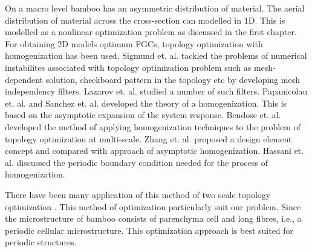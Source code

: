 \documentclass[openright,twoside]{iitkthesis}
\begin{document}
On a macro level bamboo has an asymmetric distribution of material\cite{habibi2015asymmetric}. The aerial distribution of material across the cross-section can modelled in 1D. This is modelled as a nonlinear optimization problem \cite{svanberg2007mma} as discussed in the first chapter.
For obtaining 2D models optimum FGCs, topology optimization\cite{bendsoe2009topology} with homogenization has been used. Sigmund et. al. \cite{sigmund1998numerical} tackled the problems of numerical instabilites associated with topology optimization problem such as mesh-dependent solution, checkboard pattern in the topology etc by developing mesh independency filters. Lazarov et. al. \cite{lazarov2011filters} studied a number of such filters. Papanicolau et. al. \cite{papanicolau1978asymptotic} and Sanchez et. al. \cite{sanchez1980non} developed the theory of a homogenization. This is based on the asymptotic expansion of the system response. Bendose et. al. \cite{bendsoe1988generating} developed the method of applying homogenization techniques to the problem of topology optimization at multi-scale. Zhang et. al. \cite{zhang2006scale} proposed a design element concept and compared with approach of asymptotic homogenization. Hassani et. al. \cite{hassani1998review} discussed the periodic boundary condition needed for the process of homogenization. \par 
There have been many application of this method of two scale topology optimization \cite{huang2015topology}\cite{huang2011topological}\cite{niu2009optimum}. This method of optimization particularly suit our problem. Since the microstructure of bamboo consists of parenchyma cell and long fibres, i.e., a periodic cellular microstructure. This optimization approach is best suited for periodic structures. 
\newpage
\end{document}
